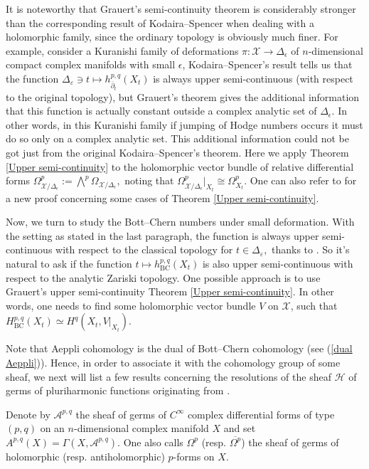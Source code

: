 \documentclass[12pt]{amsart}
\numberwithin{equation}{section}
\theoremstyle{definition}
\theoremstyle{definition}
\theoremstyle{definition}
\renewcommand{\1}{\mathsf{1}}
\newcommand{\db}{\overline{\partial}}
\renewcommand{\>}{\rightarrow}
\theoremstyle{plain} %
\theoremstyle{plain} %
\theoremstyle{plain} %
\begin{document}
	It is noteworthy that Grauert's semi-continuity theorem is considerably stronger than the corresponding result of Kodaira--Spencer when dealing with a holomorphic family, since the ordinary topology is obviously much finer.  For example, consider a Kuranishi family of deformations $\pi:\mathcal{X}\rightarrow \Delta_{\epsilon}$ of $n$-dimensional compact complex manifolds with small $\epsilon$,  Kodaira--Spencer's result tells us that the
	function $ \Delta_{\varepsilon}\ni t\mapsto h^{p,q}_{\db_t}(X_t)$
	is always upper semi-continuous (with respect to the original topology), but Grauert's theorem gives the additional information that  this function  is actually  constant outside  a complex analytic set of $\Delta_\epsilon$. In other words, in this Kuranishi family if jumping of Hodge numbers occurs it must do so only on a complex analytic set. This additional information could not be got just from the original Kodaira--Spencer's theorem. Here we apply Theorem \ref{Upper semi-continuity} to the holomorphic vector bundle of relative differential forms $ \Omega_{\mathcal X/\Delta_\epsilon}^p:=\bigwedge^{p} \Omega_{\mathcal{X} /\Delta_\epsilon },$  noting that $\Omega_{\mathcal{X} / \Delta_\epsilon}^{p}|_{ X_{t}} \cong \Omega_{X_{t}}^{p}$. One can also refer to \cite[Proposition 5.8]{Xi21b} for a new proof concerning some cases of Theorem \ref{Upper semi-continuity}.
	
	Now, we turn to study the Bott--Chern numbers under small deformation. With the  setting as stated in the last paragraph, the function is always upper semi-continuous with respect to the classical topology for $t\in \Delta_{\varepsilon},$ thanks to \cite[Theorem $4$]{KS60}. So it's natural to ask if the function  $t\mapsto h^{p,q}_{\mathrm {BC}}(X_t)$ is also upper semi-continuous with respect to the analytic Zariski topology. One possible approach is to use Grauert's upper semi-continuity Theorem \ref{Upper semi-continuity}.  In other words, one needs to find some holomorphic vector bundle $V$ on $\mathcal X$, such that  $H^{p,q}_{\mathrm {BC}}(X_t)\simeq H^q(X_t,V|_{X_t} ).$  
    
    Note  that  Aeppli cohomology is the dual of Bott--Chern cohomology (see (\ref{dual Aeppli})). Hence, in order to associate it with the cohomology group of some sheaf, we next will list a few results concerning the resolutions of the sheaf $\mathscr{H}$ of germs of pluriharmonic functions  originating from \cite{Bg69,AN71}.
	
	Denote by  $\mathscr A^{p,q}$ the sheaf of germs of $C^\infty$ complex differential forms of type $(p,q)$ on an $n$-dimensional complex manifold $X$ and set $A^{p,q}(X)=\Gamma(X,\mathscr A^{p,q})$. One also calls $\Omega^p$ (resp. $\overline{\Omega^{p}}$) the sheaf of germs of holomorphic (resp. antiholomorphic) $p$-forms on $X$.
	
\end{document}
